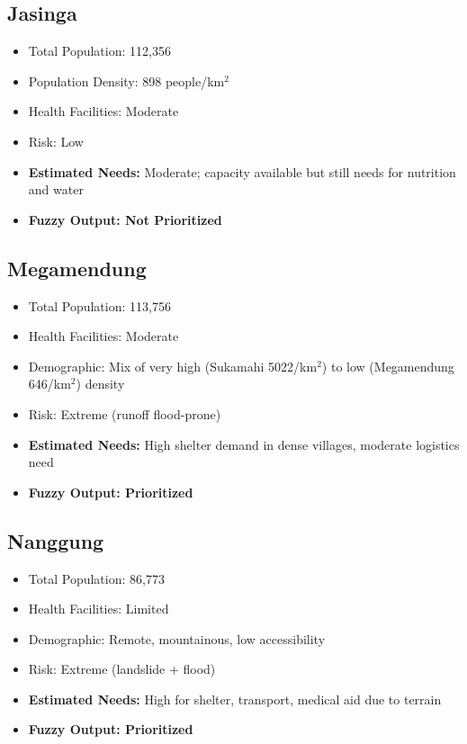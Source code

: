 \documentclass[conference,final,a4paper,twoside,10pt]{IEEEtran}
\begin{document}
\subsection*{Jasinga}
\begin{itemize}
    \item Total Population: 112,356
    \item Population Density: 898 people/km$^2$
    \item Health Facilities: Moderate
    \item Risk: Low
    \item \textbf{Estimated Needs:} Moderate; capacity available but still needs for nutrition and water
    \item \textbf{Fuzzy Output: Not Prioritized}
\end{itemize}
\subsection*{Megamendung}
\begin{itemize}
    \item Total Population: 113,756
    \item Health Facilities: Moderate
    \item Demographic: Mix of very high (Sukamahi 5022/km$^2$) to low (Megamendung 646/km$^2$) density
    \item Risk: Extreme (runoff flood-prone)
    \item \textbf{Estimated Needs:} High shelter demand in dense villages, moderate logistics need
    \item \textbf{Fuzzy Output: Prioritized}
\end{itemize}
\subsection*{Nanggung}
\begin{itemize}
    \item Total Population: 86,773
    \item Health Facilities: Limited
    \item Demographic: Remote, mountainous, low accessibility
    \item Risk: Extreme (landslide + flood)
    \item \textbf{Estimated Needs:} High for shelter, transport, medical aid due to terrain
    \item \textbf{Fuzzy Output: Prioritized}
\end{itemize}
\end{document}
